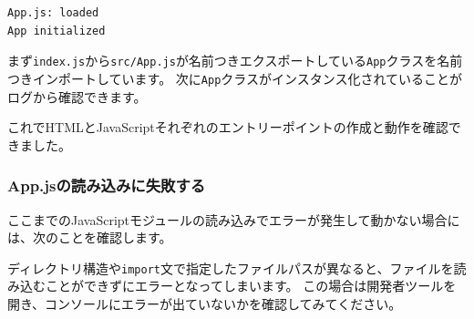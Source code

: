 \begin{lstlisting}
App.js: loaded
App initialized
\end{lstlisting}

まず\texttt{index.js}から\texttt{src/App.js}が名前つきエクスポートしている\texttt{App}クラスを名前つきインポートしています。
次に\texttt{App}クラスがインスタンス化されていることがログから確認できます。

これでHTMLとJavaScriptそれぞれのエントリーポイントの作成と動作を確認できました。

\hypertarget{error-import-app-js}{%
\subsubsection{App.jsの読み込みに失敗する}\label{error-import-app-js}}

ここまでのJavaScriptモジュールの読み込みでエラーが発生して動かない場合には、次のことを確認します。

ディレクトリ構造や\texttt{import}文で指定したファイルパスが異なると、ファイルを読み込むことができずにエラーとなってしまいます。
この場合は開発者ツールを開き、コンソールにエラーが出ていないかを確認してみてください。

